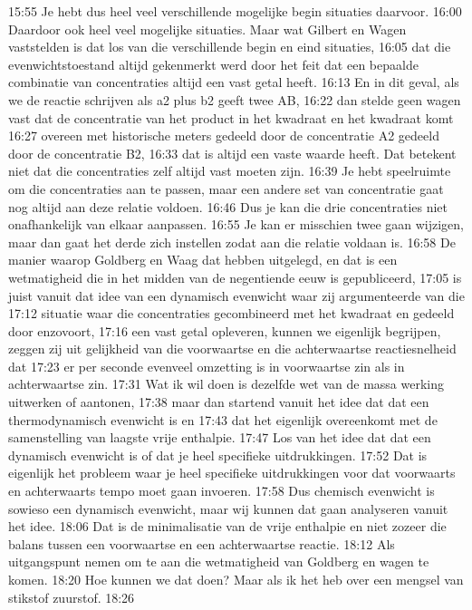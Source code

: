 15:55
Je hebt dus heel veel verschillende mogelijke begin situaties daarvoor.
16:00
Daardoor ook heel veel mogelijke situaties. Maar wat Gilbert en Wagen vaststelden is dat los van die verschillende begin en eind situaties,
16:05
dat die evenwichtstoestand altijd gekenmerkt werd door het feit dat een bepaalde combinatie van concentraties altijd een vast getal heeft.
16:13
En in dit geval, als we de reactie schrijven als a2 plus b2 geeft twee AB,
16:22
dan stelde geen wagen vast dat de concentratie van het product in het kwadraat en het kwadraat komt
16:27
overeen met historische meters gedeeld door de concentratie A2 gedeeld door de concentratie B2,
16:33
dat is altijd een vaste waarde heeft. Dat betekent niet dat die concentraties zelf altijd vast moeten zijn.
16:39
Je hebt speelruimte om die concentraties aan te passen, maar een andere set van concentratie gaat nog altijd aan deze relatie voldoen.
16:46
Dus je kan die drie concentraties niet onafhankelijk van elkaar aanpassen.
16:55
Je kan er misschien twee gaan wijzigen, maar dan gaat het derde zich instellen zodat aan die relatie voldaan is.
16:58
De manier waarop Goldberg en Waag dat hebben uitgelegd, en dat is een wetmatigheid die in het midden van de negentiende eeuw is gepubliceerd,
17:05
is juist vanuit dat idee van een dynamisch evenwicht waar zij argumenteerde van die
17:12
situatie waar die concentraties gecombineerd met het kwadraat en gedeeld door enzovoort,
17:16
een vast getal opleveren, kunnen we eigenlijk begrijpen, zeggen zij uit gelijkheid van die voorwaartse en die achterwaartse reactiesnelheid dat
17:23
er per seconde evenveel omzetting is in voorwaartse zin als in achterwaartse zin.
17:31
Wat ik wil doen is dezelfde wet van de massa werking uitwerken of aantonen,
17:38
maar dan startend vanuit het idee dat dat een thermodynamisch evenwicht is en
17:43
dat het eigenlijk overeenkomt met de samenstelling van laagste vrije enthalpie.
17:47
Los van het idee dat dat een dynamisch evenwicht is of dat je heel specifieke uitdrukkingen.
17:52
Dat is eigenlijk het probleem waar je heel specifieke uitdrukkingen voor dat voorwaarts en achterwaarts tempo moet gaan invoeren.
17:58
Dus chemisch evenwicht is sowieso een dynamisch evenwicht, maar wij kunnen dat gaan analyseren vanuit het idee.
18:06
Dat is de minimalisatie van de vrije enthalpie en niet zozeer die balans tussen een voorwaartse en een achterwaartse reactie.
18:12
Als uitgangspunt nemen om te aan die wetmatigheid van Goldberg en wagen te komen.
18:20
Hoe kunnen we dat doen? Maar als ik het heb over een mengsel van stikstof zuurstof.
18:26
